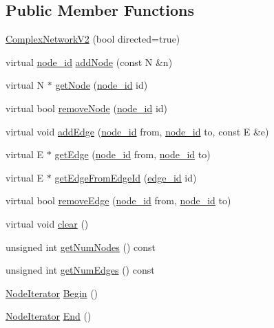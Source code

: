 \subsection*{Public Member Functions}
\begin{DoxyCompactItemize}
\item 
\hyperlink{class_complex_network_v2_ad0bc60844e1006779e826217958f9eb3}{Complex\+Network\+V2} (bool directed=true)
\item 
virtual \hyperlink{_complex_network_8hpp_a8323334ca788fde39682469321590d52}{node\+\_\+id} \hyperlink{class_complex_network_v2_ac63bea705ca74ac77cee3344e3f9609e}{add\+Node} (const N \&n)
\item 
virtual N $\ast$ \hyperlink{class_complex_network_v2_a608da16787ef57d7ae965e33ffa87469}{get\+Node} (\hyperlink{_complex_network_8hpp_a8323334ca788fde39682469321590d52}{node\+\_\+id} id)
\item 
virtual bool \hyperlink{class_complex_network_v2_a8b1b3944a3e616e722322575a6a6562b}{remove\+Node} (\hyperlink{_complex_network_8hpp_a8323334ca788fde39682469321590d52}{node\+\_\+id} id)
\item 
virtual void \hyperlink{class_complex_network_v2_ac846f08c3e92c642aa887801adee6aec}{add\+Edge} (\hyperlink{_complex_network_8hpp_a8323334ca788fde39682469321590d52}{node\+\_\+id} from, \hyperlink{_complex_network_8hpp_a8323334ca788fde39682469321590d52}{node\+\_\+id} to, const E \&e)
\item 
virtual E $\ast$ \hyperlink{class_complex_network_v2_a8eb2185022509ed813a330a9c90897b8}{get\+Edge} (\hyperlink{_complex_network_8hpp_a8323334ca788fde39682469321590d52}{node\+\_\+id} from, \hyperlink{_complex_network_8hpp_a8323334ca788fde39682469321590d52}{node\+\_\+id} to)
\item 
virtual E $\ast$ \hyperlink{class_complex_network_v2_a2379e544ee9681a2003504eb5630e3a3}{get\+Edge\+From\+Edge\+Id} (\hyperlink{_complex_network_8hpp_ad7d18d7b90a45b6625704e92d10aa3a0}{edge\+\_\+id} id)
\item 
virtual bool \hyperlink{class_complex_network_v2_ab35860c7516d18a06d08ca926d24d49d}{remove\+Edge} (\hyperlink{_complex_network_8hpp_a8323334ca788fde39682469321590d52}{node\+\_\+id} from, \hyperlink{_complex_network_8hpp_a8323334ca788fde39682469321590d52}{node\+\_\+id} to)
\item 
virtual void \hyperlink{class_complex_network_v2_a85ae14174dbd7f18e652495dea73e5fe}{clear} ()
\item 
unsigned int \hyperlink{class_complex_network_v2_a62d987623c1335d7b93b3f00e266e576}{get\+Num\+Nodes} () const 
\item 
unsigned int \hyperlink{class_complex_network_v2_ae434858a60a9dde2227c596ff000e5df}{get\+Num\+Edges} () const 
\item 
\hyperlink{class_complex_network_v2_1_1_node_iterator}{Node\+Iterator} \hyperlink{class_complex_network_v2_ad7bfe6bd62d583f42f541f959ecc05f5}{Begin} ()
\item 
\hyperlink{class_complex_network_v2_1_1_node_iterator}{Node\+Iterator} \hyperlink{class_complex_network_v2_a3a82c4a7d3579015eaf4a0c064ff7738}{End} ()
\end{DoxyCompactItemize}
